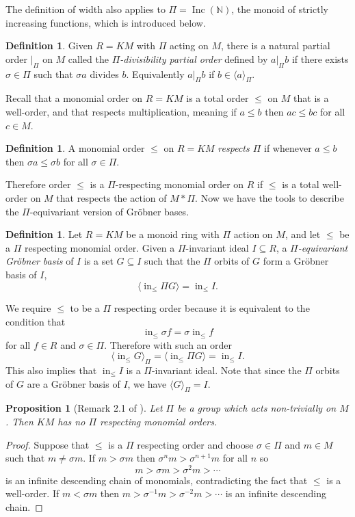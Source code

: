 \documentclass{amsart}
\newtheorem{proposition}[theorem]{Proposition}
\theoremstyle{definition}
\newtheorem{definition}[theorem]{Definition}
\theoremstyle{remark}
\numberwithin{equation}{section}
\newcommand{\B}[1]{\mathbb #1}
\newcommand{\ideal}[1]{\langle #1 \rangle}
\DeclareMathOperator{\initial}{in}
\newcommand{\Inc}{\operatorname{Inc}(\B N)}
\newcommand{\mon}{M}
\newcommand{\LT}{\initial_{\leq}}
\begin{document}
The definition of width also applies to $\Pi = \Inc$, the monoid of strictly increasing functions, which is introduced below.
 
\begin{definition}
 Given $R = K\mon$ with $\Pi$ acting on $\mon$, there is a natural partial order $|_\Pi$ on $\mon$ called the {\em $\Pi$-divisibility partial order} defined by $a |_\Pi b$ if there exists $\sigma \in \Pi$ such that $\sigma a$ divides $b$.  Equivalently $a |_\Pi b$ if $b \in \ideal{a}_\Pi$.
\end{definition}

Recall that a monomial order on $R = K\mon$ is a total order $\leq$ on $\mon$ that is a well-order, and that respects multiplication, meaning if $a \leq b$ then $ac \leq bc$ for all $c \in \mon$.

\begin{definition}
 A monomial order $\leq$ on $R = K\mon$ {\em respects $\Pi$} if whenever $a \leq b$ then $\sigma a \leq \sigma b$ for all $\sigma \in \Pi$.
\end{definition}

Therefore order $\leq$ is a $\Pi$-respecting monomial order on $R$ if $\leq$ is a total well-order on $M$ that respects the action of $\mon*\Pi$.
Now we have the tools to describe the $\Pi$-equivariant version of Gr\"obner bases.
\begin{definition}
 Let $R = K\mon$ be a monoid ring with $\Pi$ action on $\mon$, and let $\leq$ be a $\Pi$ respecting monomial order.  Given a $\Pi$-invariant ideal $I \subseteq R$, a {\em $\Pi$-equivariant Gr\"obner basis} of $I$ is a set $G \subseteq I$ such that the $\Pi$ orbits of $G$ form a Gr\"obner basis of $I$,
 \[ \ideal{\LT \Pi G} = \LT I. \]
\end{definition}
We require $\leq$ to be a $\Pi$ respecting order because it is equivalent to the condition that
\[ \LT \sigma f = \sigma \LT f \]
for all $f \in R$ and $\sigma \in \Pi$.  Therefore with such an order
 \[ \ideal{\LT G}_{\Pi} = \ideal{\LT \Pi G} = \LT I. \]
This also implies that $\LT I$ is a $\Pi$-invariant ideal.  Note that since the $\Pi$ orbits of $G$ are a Gr\"obner basis of $I$, we have $\ideal{G}_\Pi = I$.


\begin{proposition}[Remark 2.1 of \cite{Brouwer09e}]\label{prop:nogroup}
 Let $\Pi$ be a group which acts non-trivially on $\mon$.  Then $K\mon$ has no $\Pi$ respecting monomial orders.
\end{proposition}
\begin{proof}
 Suppose that $\leq$ is a $\Pi$ respecting order and choose $\sigma \in \Pi$ and $m \in \mon$ such that $m \neq \sigma m$.  If $m > \sigma m$ then $\sigma^n m > \sigma^{n+1} m$ for all $n$ so
  \[ m > \sigma m > \sigma^2 m > \cdots \]
 is an infinite descending chain of monomials, contradicting the fact that $\leq$ is a well-order.  If $m < \sigma m$ then $m > \sigma^{-1} m > \sigma^{-2} m > \cdots$ is an infinite descending chain.
\end{proof}
\end{document}
